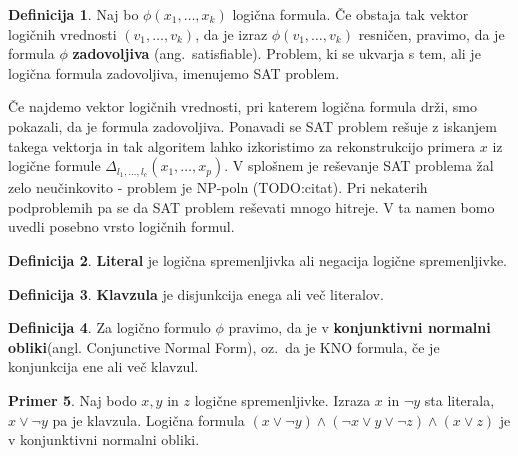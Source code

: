 \documentclass[12pt,a4paper,twoside]{article}
\theoremstyle{definition} %
\newtheorem{definicija}{Definicija}[section]
\newtheorem{primer}[definicija]{Primer}
\theoremstyle{plain} %
\numberwithin{equation}{section}  %
\begin{document}
\begin{definicija}
	Naj bo $\phi(x_1,\ldots,x_k)$ logična formula.
	Če obstaja tak vektor logičnih vrednosti $(v_1, \ldots, v_k)$, da je izraz $\phi(v_1, \ldots, v_k)$ resničen,
	pravimo, da je formula $\phi$ \textbf{zadovoljiva} (ang.~satisfiable).
	Problem, ki se ukvarja s tem, ali je logična formula zadovoljiva, imenujemo SAT problem. %
\end{definicija}
Če najdemo vektor logičnih vrednosti, pri katerem logična formula drži, smo pokazali, da je formula zadovoljiva.
Ponavadi se SAT problem rešuje z iskanjem takega vektorja in tak algoritem lahko izkoristimo za rekonstrukcijo primera $x$ iz logične formule $\Delta_{l_1,\ldots,l_c}(x_1,\ldots,x_p)$.
V splošnem je reševanje SAT problema žal zelo neučinkovito - problem je NP-poln (TODO:citat).
Pri nekaterih podproblemih pa se da SAT problem reševati mnogo hitreje. 
V ta namen bomo uvedli posebno vrsto logičnih formul.

\begin{definicija}
	\textbf{Literal} je logična spremenljivka ali negacija logične spremenljivke.
\end{definicija}

\begin{definicija}
	\textbf{Klavzula} je disjunkcija enega ali več literalov.
\end{definicija}

\begin{definicija}
	Za logično formulo $\phi$ pravimo, da je v \textbf{konjunktivni normalni obliki}(angl. Conjunctive Normal Form), 
	oz.~da je KNO formula, če je konjunkcija ene ali več klavzul.
\end{definicija}

\begin{primer}
	Naj bodo $x,y$ in $z$ logične spremenljivke. Izraza $x$ in $\lnot y$ sta literala, $x \lor \lnot y$ pa je klavzula.
	Logična formula $(x \lor \lnot y) \land (\lnot x \lor y \lor \lnot z) \land (x \lor z)$ je v konjunktivni normalni obliki.
\end{primer}
\end{document}
